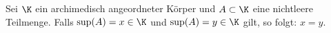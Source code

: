 \begin{exercise}
  Sei $\K$ ein archimedisch angeordneter Körper und $A \subset \K$ eine
  nichtleere Teilmenge. Falls $\sup (A) = x \in \K$ und $\sup (A) = y \in \K$
  gilt, so folgt: $x = y$.
\end{exercise}
